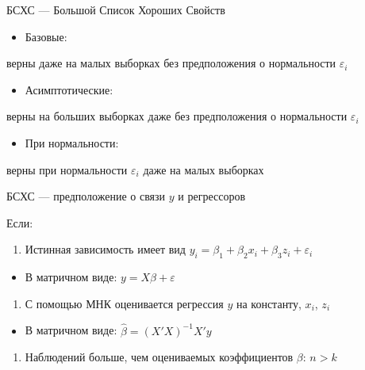 \documentclass[russian,ignorenonframetext,]{beamer}
\providecommand{\tightlist}{%
  \setlength{\itemsep}{0pt}\setlength{\parskip}{0pt}}
\begin{document}
\begin{frame}{БСХС --- Большой Список Хороших Свойств}

\begin{itemize}
\tightlist
\item
  Базовые:
\end{itemize}

верны даже на малых выборках без предположения о нормальности
\(\varepsilon_i\)

\begin{itemize}
\tightlist
\item
  Асимптотические:
\end{itemize}

верны на больших выборках даже без предположения о нормальности
\(\varepsilon_i\)

\begin{itemize}
\tightlist
\item
  При нормальности:
\end{itemize}

верны при нормальности \(\varepsilon_i\) даже на малых выборках

\end{frame}

\begin{frame}{БСХС --- предположение о связи \(y\) и регрессоров}

Если:

\begin{enumerate}
\def\labelenumi{\arabic{enumi}.}
\tightlist
\item
  Истинная зависимость имеет вид
  \(y_i=\beta_1 + \beta_2 x_i + \beta_3 z_i+\varepsilon_i\)
\end{enumerate}

\begin{itemize}
\tightlist
\item
  В матричном виде: \(y=X\beta + \varepsilon\)
\end{itemize}

\begin{enumerate}
\def\labelenumi{\arabic{enumi}.}
\setcounter{enumi}{1}
\tightlist
\item
  С помощью МНК оценивается регрессия \(y\) на константу, \(x_i\),
  \(z_i\)
\end{enumerate}

\begin{itemize}
\tightlist
\item
  В матричном виде: \(\hat{\beta}=(X'X)^{-1}X'y\)
\end{itemize}

\begin{enumerate}
\def\labelenumi{\arabic{enumi}.}
\setcounter{enumi}{2}
\tightlist
\item
  Наблюдений больше, чем оцениваемых коэффициентов \(\beta\): \(n>k\)
\end{enumerate}

\end{frame}
\end{document}
